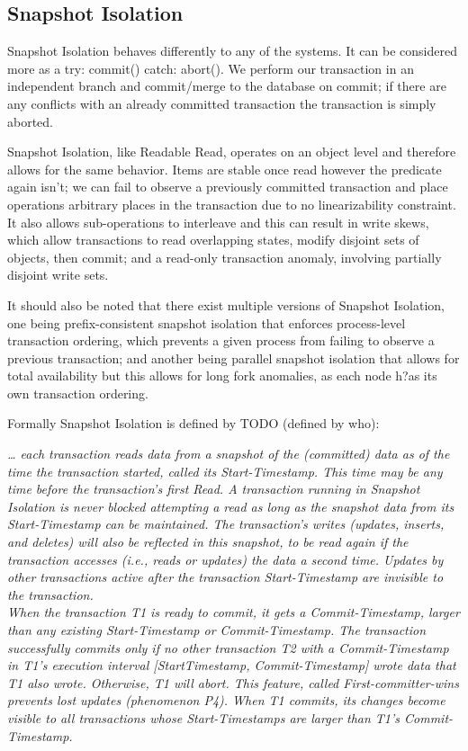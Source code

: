 \documentclass[a4paper,10pt,titlepage]{report}
\begin{document}
\subsection{Snapshot Isolation}

Snapshot Isolation behaves differently to any of the systems. It can be considered more as a try: commit() catch: abort(). We perform our transaction in an independent branch and commit/merge to the database on commit; if there are any conflicts with an already committed transaction the transaction is simply aborted. 

Snapshot Isolation, like Readable Read, operates on an object level and therefore allows for the same behavior. Items are stable once read however the predicate again isn't; we can fail to observe a previously committed transaction and place operations arbitrary places in the transaction due to no linearizability constraint. It also allows sub-operations to interleave  and this can result in write skews, which allow transactions to read overlapping states, modify disjoint sets of objects, then commit; and a read-only transaction anomaly, involving partially disjoint write sets.


It should also be noted that there exist multiple versions of Snapshot Isolation, one being prefix-consistent snapshot isolation that enforces process-level transaction ordering, which prevents a given process from failing to observe a previous transaction; and another being parallel snapshot isolation that allows for total availability but this allows for long fork anomalies, as each node h?as its own transaction ordering.

Formally Snapshot Isolation is defined by TODO (defined by who):\cite{Berensonetal}

\textit{… each transaction reads data from a snapshot of the (committed) data as of the time the transaction started, called its Start-Timestamp. This time may be any time before the transaction's first Read. A transaction running in Snapshot Isolation is never blocked attempting a read as long as the snapshot data from its Start-Timestamp can be maintained. The transaction's writes (updates, inserts, and deletes) will also be reflected in this snapshot, to be read again if the transaction accesses (i.e., reads or updates) the data a second time. Updates by other transactions active after the transaction Start-Timestamp are invisible to the transaction.
\\
When the transaction T1 is ready to commit, it gets a Commit-Timestamp, larger than any existing Start-Timestamp or Commit-Timestamp. The transaction successfully commits only if no other transaction T2 with a Commit-Timestamp in T1's execution interval [StartTimestamp, Commit-Timestamp] wrote data that T1 also wrote. Otherwise, T1 will abort. This feature, called First-committer-wins prevents lost updates (phenomenon P4). When T1 commits, its changes become visible to all transactions whose Start-Timestamps are larger than T1's Commit-Timestamp.}
\end{document}
